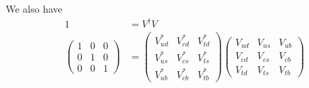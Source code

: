 \begin{enumerate}
	We also have 
	\begin{align*}
		1 &= V^\dagger V\\
		\begin{pmatrix}
			1 & 0 & 0 \\
			0 & 1 & 0 \\
			0 & 0 & 1
		\end{pmatrix}
		&= 
		\begin{pmatrix}
			V_{ud}^* & V_{cd}^* & V_{td}^*\\
			V_{us}^* & V_{cs}^* & V_{ts}^*\\
			V_{ub}^* & V_{cb}^* & V_{tb}^*
		\end{pmatrix}
		\begin{pmatrix}
			V_{ud} & V_{us} & V_{ub}\\
			V_{cd} & V_{cs} & V_{cb}\\
			V_{td} & V_{ts} & V_{tb}
		\end{pmatrix}
	\end{align*}
	

\end{enumerate}
